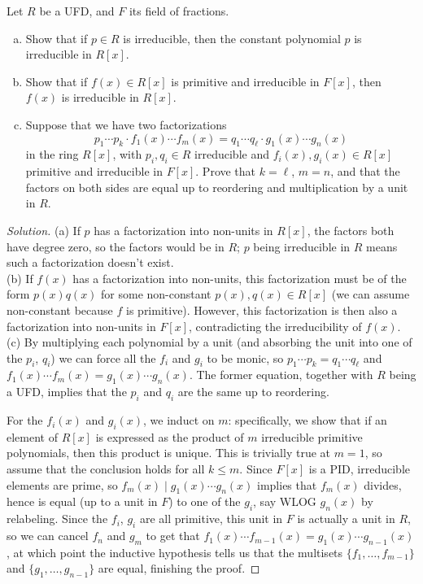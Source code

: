 \documentclass[10pt]{article}
\providecommand{\ii}{\item}
\newenvironment{soln}{\begin{proof}[Solution]}{\end{proof}}
\begin{document}
\begin{problem}
    Let $R$ be a UFD, and $F$ its field of fractions.
    \begin{enumerate}[(a)]
        \ii Show that if $p\in R$ is irreducible,
	then the constant polynomial $p$ is irreducible in $R[x]$.
	\ii Show that if $f(x)\in R[x]$ is primitive and irreducible in $F[x]$,
	then $f(x)$ is irreducible in $R[x]$.
	\ii Suppose that we have two factorizations
	\begin{equation*}
	    p_1\cdots p_k\cdot f_1(x)\cdots f_m(x) =
	    q_1\cdots q_\ell\cdot g_1(x)\cdots g_n(x)
	\end{equation*}
	in the ring $R[x]$, with $p_i,q_i\in R$ irreducible
	and $f_i(x),g_i(x)\in R[x]$ primitive and irreducible in $F[x]$.
	Prove that $k=\ell$, $m=n$,
	and that the factors on both sides are equal up to reordering
	and multiplication by a unit in $R$.
    \end{enumerate}
\end{problem}

\begin{soln}
    (a) If $p$ has a factorization into non-units in $R[x]$,
    the factors both have degree zero, so the factors would be in $R$;
    $p$ being irreducible in $R$ means such a factorization doesn't exist.
    \\

    (b) If $f(x)$ has a factorization into non-units,
    this factorization must be of the form $p(x)q(x)$
    for some non-constant $p(x),q(x)\in R[x]$
    (we can assume non-constant because $f$ is primitive).
    However, this factorization is then also a factorization
    into non-units in $F[x]$, contradicting the irreducibility of $f(x)$.
    \\

    (c) By multiplying each polynomial by a unit
    (and absorbing the unit into one of the $p_i$, $q_i$)
    we can force all the $f_i$ and $g_i$ to be monic,
    so $p_1\cdots p_k = q_1\cdots q_\ell$
    and $f_1(x)\cdots f_m(x) = g_1(x)\cdots g_n(x)$.
    The former equation, together with $R$ being a UFD,
    implies that the $p_i$ and $q_i$ are the same up to reordering.

    For the $f_i(x)$ and $g_i(x)$, we induct on $m$:
    specifically, we show that if an element of $R[x]$
    is expressed as the product of $m$ irreducible primitive polynomials,
    then this product is unique. This is trivially true at $m=1$,
    so assume that the conclusion holds for all $k\le m$.
    Since $F[x]$ is a PID, irreducible elements are prime, so
    $f_m(x)\mid g_1(x)\cdots g_n(x)$ implies that
    $f_m(x)$ divides, hence is equal (up to a unit in $F$) to one of the $g_i$,
    say WLOG $g_n(x)$ by relabeling. Since the $f_i$, $g_i$
    are all primitive, this unit in $F$ is actually a unit in $R$,
    so we can cancel $f_n$ and $g_m$
    to get that $f_1(x)\cdots f_{m-1}(x) = g_1(x)\cdots g_{n-1}(x)$,
    at which point the inductive hypothesis tells us that the multisets
    $\{f_1,\dots,f_{m-1}\}$ and $\{g_1,\dots,g_{n-1}\}$ are equal,
    finishing the proof.
\end{soln}
\end{document}
